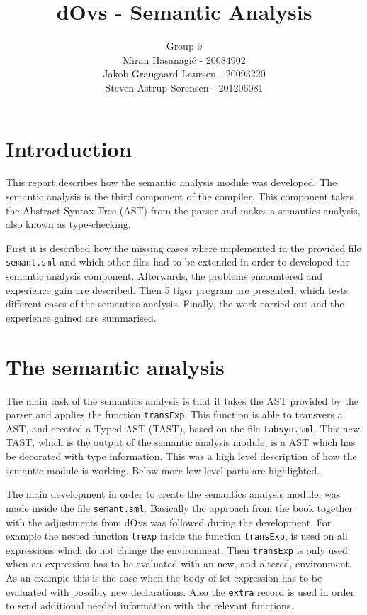 \documentclass{article}
\title{dOvs - Semantic Analysis}
\author{
  Group 9 \\
  Miran Hasanagi\'{c} - 20084902 \\
  Jakob Graugaard Laursen - 20093220\\
  Steven Astrup S\o rensen - 201206081
}
\begin{document}
\maketitle

\section{Introduction}
This report describes how the semantic analysis module was developed. The semantic analysis is the third component of the compiler. This component takes the Abstract Syntax Tree (AST) from the parser and makes a semantics analysis, also known as type-checking. 

First it is described how the missing cases where implemented in the provided file \texttt{semant.sml} and which other files had to be extended in order to developed the semantic analysis component. Afterwards, the problems encountered and experience gain are described. Then 5 tiger program are presented, which tests different cases of the semantics analysis. Finally, the work carried out and the experience gained are summarised. 

\section{The semantic analysis}
The main task of the semantics analysis is that it takes the AST provided by the parser and applies the function \texttt{transExp}. This function is able to transvers a AST, and created a Typed AST (TAST), based on the file \texttt{tabsyn.sml}. This new TAST, which is the output of the semantic analysis module, is a AST which has be decorated with type information. This was a high level description of how the semantic module is working. Below more low-level parts are highlighted.

The main development in order to create the semantics analysis module, was made inside the file \texttt{semant.sml}. Basically the approach from the book together with the adjustments from dOvs was followed during the development. For example the nested function \texttt{trexp} inside the function \texttt{transExp}, is used on all expressions which do not change the environment. Then \texttt{transExp} is only used when an expression has to be evaluated with an new, and altered, environment. As an example this is the case when the body of let expression has to be evaluated with possibly new declarations. Also the \texttt{extra} record is used in order to send additional needed information with the relevant functions.
\end{document}
